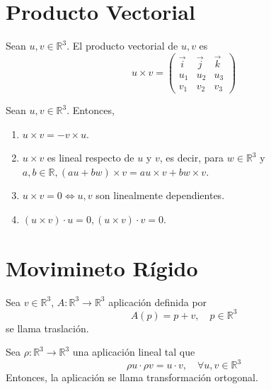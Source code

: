 \section{Producto Vectorial}

\begin{defn}
  Sean $u, v \in \mathbb{R}^{3}$. El producto vectorial de $u, v$ es
  \[ 
    u \times v = 
    \begin{pmatrix}
       \vec{i} & \vec{j} & \vec{k}\\
       u_{1} & u_{2} & u_{3}\\
       v_{1} & v_{2} & v_{3}
    \end{pmatrix}
  \] 
\end{defn}

\begin{prop}
  Sean $u, v \in \mathbb{R}^{3}$. Entonces,
  \begin{enumerate}[label=(\roman*)]
    \item $u \times v = -v \times u$.
    \item $u \times v$ es lineal respecto de $u$ y $v$, es decir, para $w \in \mathbb{R}^{3}$ y $a, b \in \mathbb{R}, (au + bw) \times v = au \times v + bw \times v$.
    \item $u \times v = 0 \Leftrightarrow u, v$ son linealmente dependientes.
    \item $(u \times v) \cdot u = 0, (u \times v) \cdot v = 0$.
  \end{enumerate}
\end{prop}

\section{Movimineto Rígido}

\begin{defn}[Traslación]
  Sea $v \in \mathbb{R}^{3}$, $A : \mathbb{R}^{3} \to \mathbb{R}^{3}$ aplicación definida por
  \[ 
    A(p) = p + v, \quad p \in \mathbb{R}^{3} 
  \] 
  se llama traslación.
\end{defn}

\begin{defn}
  Sea $\rho : \mathbb{R}^{3} \to \mathbb{R}^{3}$ una aplicación lineal tal que
  \[ 
    \rho u \cdot \rho v = u \cdot v, \quad \forall u, v \in \mathbb{R}^{3}
  \] 
  Entonces, la aplicación se llama transformación ortogonal.
\end{defn}


